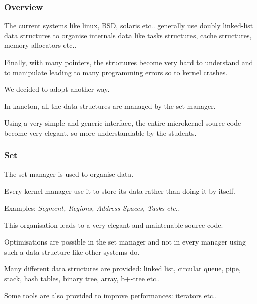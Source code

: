 \documentclass[8pt]{beamer}
\newcommand{\nl}[0]{\vspace{0.4cm}}
\begin{document}
\begin{frame}
  \frametitle{Overview}

  The current systems like linux, BSD, solaris etc.. generally use
  doubly linked-list data structures to organise internals data like
  tasks structures, cache structures, memory allocators etc..

  \nl

  Finally, with many pointers, the structures become very hard to understand
  and to manipulate leading to many programming errors so to kernel
  crashes.

  \nl

  We decided to adopt another way.

  \nl

  In kaneton, all the data structures are managed by the set manager.

  \nl

  Using a very simple and generic interface, the entire microkernel source
  code become very elegant, so more understandable by the students.
\end{frame}


\begin{frame}
  \frametitle{Set}

  The set manager is used to organise data.

  \nl

  Every kernel manager use it to store its data rather than doing it
  by itself.

  \nl

  Examples: \textit{Segment, Regions, Address Spaces, Tasks etc..}

  \nl

  This organisation leads to a very elegant and maintenable source code.

  \nl

  Optimisations are possible in the set manager and not in every
  manager using such a data structure like other systems do.

  \nl

  Many different data structures are provided: linked list, circular
  queue, pipe, stack, hash tables, binary tree, array, b+-tree etc..

  \nl

  Some tools are also provided to improve performances: iterators etc..
\end{frame}

\end{document}
